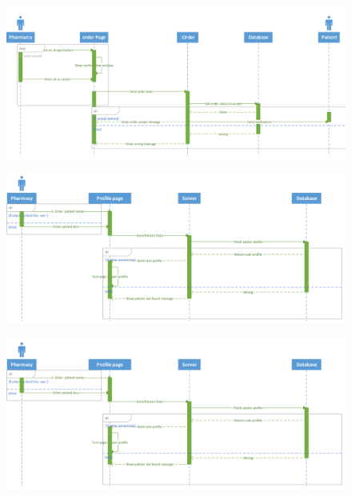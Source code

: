 \documentclass[]{article}
\begin{document}
\begin{figure}[H]
\centering
\includegraphics[scale=0.28]{./sequence/22}
\end{figure}
\begin{figure}[H]
\centering
\includegraphics[scale=0.3]{./sequence/23}
\end{figure}
\begin{figure}[H]
\centering
\includegraphics[scale=0.3]{./sequence/23}
\end{figure}
\end{document}

